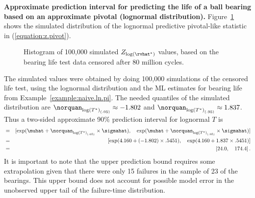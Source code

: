 \begin{example}
\label{example:pivot.ln.pi}
{\bf Approximate prediction interval for predicting the life
of a ball bearing based on an approximate pivotal (lognormal distribution).}
Figure~\ref{figure:lzb5.lognor.pivot.hist.ps} shows the simulated
distribution of the lognormal predictive pivotal-like statistic in
(\ref{equation:z.pivot}).
\begin{figure}
\caption{Histogram of 100,000 simulated $Z_{\log(\rvhat^{*})}$ 
values, based on the bearing life test data censored after 80 million cycles.}
\label{figure:lzb5.lognor.pivot.hist.ps}
\end{figure}
The simulated values were obtained by doing 100,000 simulations of the
censored life test, using the lognormal distribution and the ML
estimates for bearing life from Example~\ref{example:naive.ln.pi}.  The
needed quantiles of the simulated distribution are
$\norquan_{{\log(T^{*})}_{(.05)}}\approx -1.802$ and
$\norquan_{{\log(T^{*})}_{(.95)}} \approx 1.837$. Thus a two-sided
approximate 90\% prediction interval for lognormal $T$ is
\begin{eqnarray*}
[ \Tlower, \quad \Tupper ]& = &
	[ \exp(\muhat + \norquan_{{\log(T^{*})}_{(.05)}} \times \sigmahat), 
	\quad \exp(\muhat +\norquan_{{\log(T^{*})}_{(.95)}} \times \sigmahat) ]\\& = &
	\left[ \exp(4.160 +(-1.802) \times .5451), \quad 
\exp(4.160 + 1.837  \times .5451) \right ] \\ & = &
	\left[ 24.0, \quad 174.4 \right ].
\end{eqnarray*}
It is important to note that the upper prediction bound requires
some extrapolation given that there were only
15 failures in the sample of 23 of the bearings.  This upper bound
does not account for possible model error in the unobserved upper
tail of the failure-time distribution.
\end{example}

